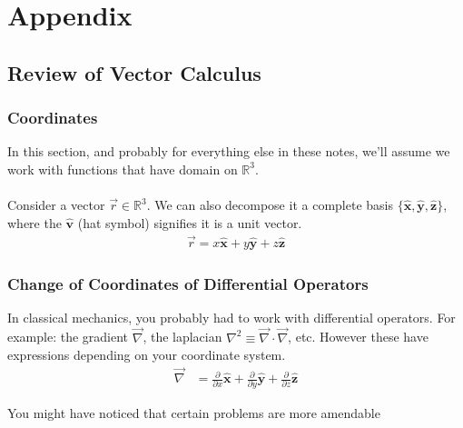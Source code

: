 \documentclass[12pt,fleqn]{article}
\numberwithin{equation}{section} %
\newcounter{problem}
\begin{document}
\newpage
\section{Appendix}

\subsection{Review of Vector Calculus}
\subsubsection{Coordinates}
In this section, and probably for everything else in these notes, we'll assume we work with functions that have domain on $\mathbb R^3$.\\
\\
Consider a vector $\vec r \in \mathbb R^3$. We can also decompose it a complete basis $\{\mathbf{\hat x}, \mathbf{\hat y}, \mathbf{\hat z}\}$, where the $\mathbf{\hat v}$ (hat symbol) signifies it is a unit vector.
\begin{align}
	\vec r  = x \mathbf{\hat x} + y \mathbf{\hat y} + z \mathbf {\hat z}
\end{align}




\subsubsection{Change of Coordinates of Differential Operators}
In classical mechanics, you probably had to work with differential operators. For example: the gradient $\vec \nabla$, the laplacian $\nabla^2 \equiv \vec \nabla \cdot \vec \nabla$, etc. However these have expressions depending on your coordinate system.
\begin{align}
	\vec \nabla & = \frac{\partial}{\partial x} \mathbf{\hat x} + \frac{\partial}{\partial y} \mathbf{\hat y} + \frac{\partial}{\partial z} \mathbf{\hat z}
\end{align}


 You might have noticed that certain problems are more amendable 
\end{document}
